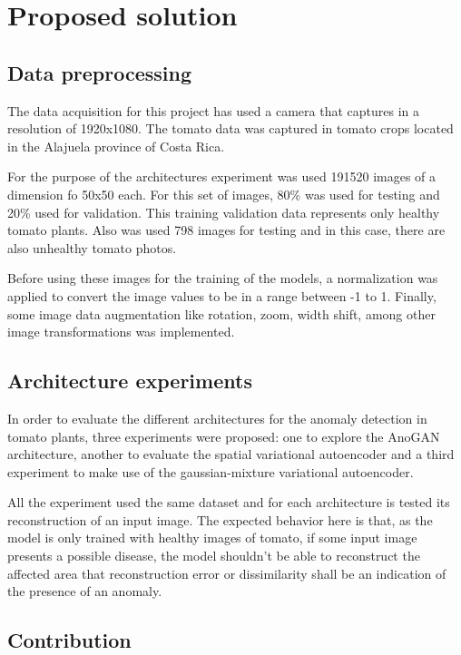 \chapter{Proposed solution}
\label{ch:solution}

\section{Data preprocessing}

The data acquisition for this project has used a camera that captures in a resolution of 1920x1080. The tomato data was captured in tomato crops located in the Alajuela province of Costa Rica.

For the purpose of the architectures experiment was used 191520 images of a dimension fo 50x50 each. For this set of images, 80\% was used for testing and 20\% used for validation. This training validation data represents only healthy tomato plants. Also was used 798 images for testing and in this case, there are also unhealthy tomato photos.

Before using these images for the training of the models, a normalization was applied to convert the image values to be in a range between -1 to 1. Finally, some image data augmentation like rotation, zoom, width shift, among other image transformations was implemented.

\section{Architecture experiments}

In order to evaluate the different architectures for the anomaly detection in tomato plants, three experiments were proposed: one to explore the AnoGAN architecture, another to evaluate the spatial variational autoencoder and a third experiment to make use of the gaussian-mixture variational autoencoder.

All the experiment used the same dataset and for each architecture is tested its reconstruction of an input image. The expected behavior here is that, as the model is only trained with healthy images of tomato, if some input image presents a possible disease, the model shouldn't be able to reconstruct the affected area that reconstruction error or dissimilarity shall be an indication of the presence of an anomaly.

\section{Contribution}


